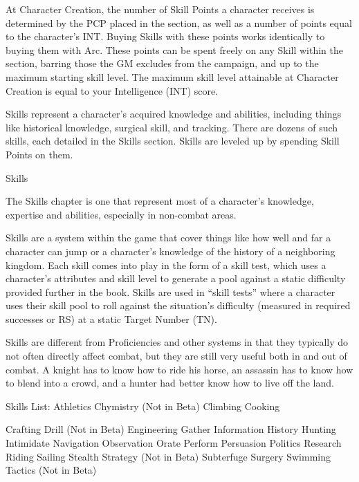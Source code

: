 \documentclass[oneside,11pt,english]{book}
\begin{document}
At Character Creation, the number of Skill Points a character receives is determined by the PCP placed in 
the section, as well as a number of points equal to the character’s INT. Buying Skills with these points 
works identically to buying them with Arc. These points can be spent freely on any Skill within the 
section, barring those the GM excludes from the campaign, and up to the maximum starting skill level. 
The maximum skill level attainable at Character Creation is equal to your Intelligence (INT) score. 

 

Skills represent a character's acquired knowledge and abilities, including things like historical knowledge, 
surgical skill, and tracking. There are dozens of such skills, each detailed in the Skills section. Skills are 
leveled up by spending Skill Points on them. 

 

 
Skills 

 

 

 

The Skills chapter is one that represent most of a character’s knowledge, expertise and abilities, especially 
in non-combat areas. 

 

Skills are a system within the game that cover things like how well and far a character can jump or a 
character’s knowledge of the history of a neighboring kingdom. Each skill comes into play in the form of 
a skill test, which uses a character’s attributes and skill level to generate a pool against a static difficulty 
provided further in the book. Skills are used in “skill tests” where a character uses their skill pool to roll 
against the situation’s difficulty (measured in required successes or RS) at a static Target Number (TN). 

 

Skills are different from Proficiencies and other systems in that they typically do not often directly affect 
combat, but they are still very useful both in and out of combat. A knight has to know how to ride his 
horse, an assassin has to know how to blend into a crowd, and a hunter had better know how to live off 
the land. 

 

Skills List: 
Athletics 
Chymistry (Not in Beta) 
Climbing 
Cooking 


Crafting 
Drill (Not in Beta) 
Engineering 
Gather Information 
History 
Hunting 
Intimidate 
Navigation 
Observation 
Orate 
Perform 
Persuasion 
Politics 
Research 
Riding 
Sailing 
Stealth 
Strategy (Not in Beta) 
Subterfuge 
Surgery 
Swimming 
Tactics (Not in Beta) 
\end{document}
